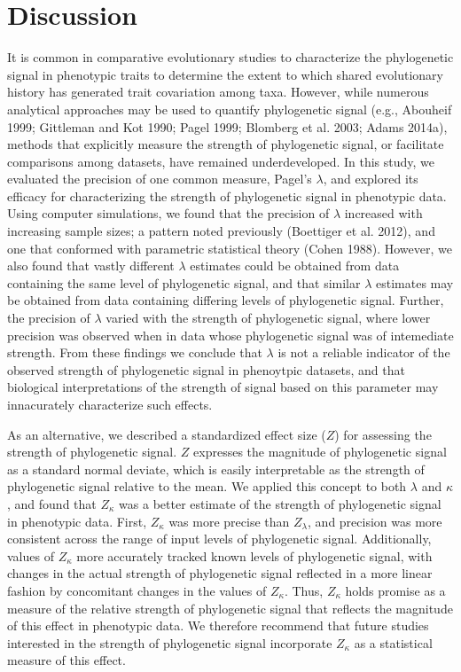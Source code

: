 \documentclass[
]{article}
\begin{document}
\hypertarget{discussion}{%
\section{Discussion}\label{discussion}}

It is common in comparative evolutionary studies to characterize the
phylogenetic signal in phenotypic traits to determine the extent to
which shared evolutionary history has generated trait covariation among
taxa. However, while numerous analytical approaches may be used to
quantify phylogenetic signal (e.g., Abouheif 1999; Gittleman and Kot
1990; Pagel 1999; Blomberg et al. 2003; Adams 2014a), methods that
explicitly measure the strength of phylogenetic signal, or facilitate
comparisons among datasets, have remained underdeveloped. In this study,
we evaluated the precision of one common measure, Pagel's \(\lambda\),
and explored its efficacy for characterizing the strength of
phylogenetic signal in phenotypic data. Using computer simulations, we
found that the precision of \(\lambda\) increased with increasing sample
sizes; a pattern noted previously (Boettiger et al. 2012), and one that
conformed with parametric statistical theory (Cohen 1988). However, we
also found that vastly different \(\lambda\) estimates could be obtained
from data containing the same level of phylogenetic signal, and that
similar \(\lambda\) estimates may be obtained from data containing
differing levels of phylogenetic signal. Further, the precision of
\(\lambda\) varied with the strength of phylogenetic signal, where lower
precision was observed when in data whose phylogenetic signal was of
intemediate strength. From these findings we conclude that \(\lambda\)
is not a reliable indicator of the observed strength of phylogenetic
signal in phenoytpic datasets, and that biological interpretations of
the strength of signal based on this parameter may innacurately
characterize such effects. \hfill\break

As an alternative, we described a standardized effect size (\(Z\)) for
assessing the strength of phylogenetic signal. \(Z\) expresses the
magnitude of phylogenetic signal as a standard normal deviate, which is
easily interpretable as the strength of phylogenetic signal relative to
the mean. We applied this concept to both \(\lambda\) and \(\kappa\),
and found that \(Z_\kappa\) was a better estimate of the strength of
phylogenetic signal in phenotypic data. First, \(Z_\kappa\) was more
precise than \(Z_{\lambda}\), and precision was more consistent across
the range of input levels of phylogenetic signal. Additionally, values
of \(Z_\kappa\) more accurately tracked known levels of phylogenetic
signal, with changes in the actual strength of phylogenetic signal
reflected in a more linear fashion by concomitant changes in the values
of \(Z_\kappa\). Thus, \(Z_\kappa\) holds promise as a measure of the
relative strength of phylogenetic signal that reflects the magnitude of
this effect in phenotypic data. We therefore recommend that future
studies interested in the strength of phylogenetic signal incorporate
\(Z_\kappa\) as a statistical measure of this effect. \hfill\break
\end{document}
